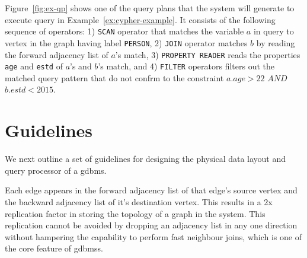 Figure~\ref{fig:ex-qp} shows one of the query plans that the system will generate to execute query in Example~\ref{ex:cypher-example}. It consists of the following sequence of operators: 1) \texttt{SCAN} operator that matches the variable $a$ in query to vertex in the graph having label \texttt{PERSON}, 2) \texttt{JOIN} operator matches $b$ by reading the forward adjacency list of $a$'s match, 3) \texttt{PROPERTY READER} reads the properties \texttt{age} and \texttt{estd} of $a$'s and $b$'s match, and 4) \texttt{FILTER} operators filters out the matched query pattern that do not confrm to the constraint $a.age > 22$ $AND$ $b.estd < 2015$.

\section{Guidelines}
\label{sec:guidelines}

We next outline a set of guidelines for designing the physical data layout and query processor of a \gls{gdbms}.

\begin{guideline}
Each edge appears in the forward adjacency list of that edge's source vertex and the backward adjacency list of it's destination vertex. This results in a 2x replication factor in storing the topology of a graph in the system. This  replication cannot be avoided by dropping an adjacency list in any one direction without hampering the capability to perform fast neighbour joins, which is one of the core feature of \gls{gdbms}s.
\end{guideline}

